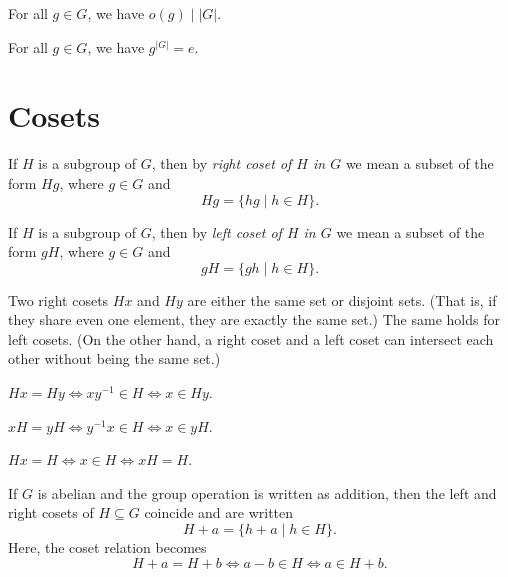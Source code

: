 \documentclass{amsart}
\begin{document}
\begin{corollary}
	For all $g \in G$, we have $o(g) \mid |G|$.
\end{corollary}

\begin{corollary}
	For all $g \in G$, we have $g^{|G|} = e$.
\end{corollary}

\section*{Cosets}

\begin{definition}
		If $H$ is a subgroup of $G$, then by \emph{right coset of $H$ in $G$} we
		mean a subset of the form $Hg$, where $g \in G$ and \[Hg = \{hg \mid h \in
		H\}.\]
\end{definition}

\begin{definition}
		If $H$ is a subgroup of $G$, then by \emph{left coset of $H$ in $G$} we
		mean a subset of the form $gH$, where $g \in G$ and \[gH = \{gh \mid h \in
		H\}.\]
\end{definition}

\begin{theorem}
	Two right cosets $Hx$ and $Hy$ are either the same set or disjoint sets.
	(That is, if they share even one element, they are exactly the same set.) The
	same holds for left cosets. (On the other hand, a right coset and a left
	coset can intersect each other without being the same set.)
\end{theorem}

\begin{corollary}
	$Hx = Hy \Longleftrightarrow xy^{-1} \in H \Longleftrightarrow x \in Hy$.
\end{corollary}

\begin{corollary}
	$xH = yH \Longleftrightarrow y^{-1}x \in H \Longleftrightarrow x \in yH$.
\end{corollary}

\begin{corollary}
	$Hx = H \Longleftrightarrow x \in H \Longleftrightarrow xH = H$.
\end{corollary}

\begin{notation}
	If $G$ is abelian and the group operation is written as addition, then the
	left and right cosets of $H \subseteq G$ coincide and are written
	\[H + a = \{h + a \mid h \in H\}.\]
	Here, the coset relation becomes
	\[H + a = H + b \Longleftrightarrow a - b \in H \Longleftrightarrow a \in H +
		b.\]
\end{notation}
\end{document}
